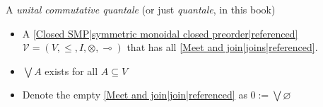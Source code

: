 
A \emph{unital commutative quantale} (or just \emph{quantale}, in this book)

\begin{itemize}
    \item  A \ref{Closed SMP|symmetric monoidal closed preorder|referenced} $\mathcal{V}=(V,\leq,I,\otimes,\multimap)$ that has all \ref{Meet and join|joins|referenced}.
    \item $\bigvee A$ exists for all $A \subseteq V$
    \item Denote the empty \ref{Meet and join|join|referenced} as $0 := \bigvee \varnothing$
  \end{itemize}
